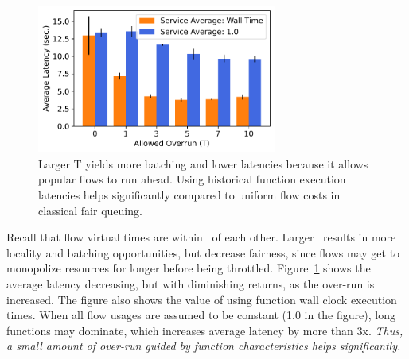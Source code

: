 
\begin{figure}
  \centering
  \includegraphics[width=0.7\textwidth]{./mqfq-final/graphs/unfairness/25.7/e2e_sec.pdf} 
  \caption{Larger T yields more batching and lower latencies because it allows popular flows to run ahead. Using historical function execution latencies helps significantly compared to uniform flow costs in classical fair queuing.}
  \label{fig:T-service}
\end{figure}

Recall that flow virtual times are within \T~of each other.
Larger \T~results in more locality and batching opportunities, but decrease fairness, since flows may get to monopolize resources for longer before being throttled.
Figure~\ref{fig:T-service} shows the average latency decreasing, but with diminishing returns, as the over-run is increased. 
The figure also shows the value of using function wall clock execution times.
When all flow usages are assumed to be constant (1.0 in the figure), long functions may dominate, which increases average latency by more than 3x.
\emph{Thus, a small amount of over-run guided by function characteristics helps significantly.}

